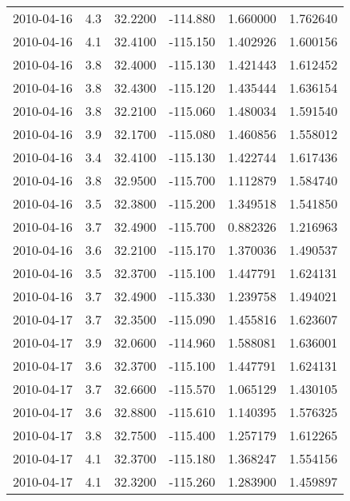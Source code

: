 \begin{tabular}{lrrrrr}
2010-04-16 &       4.3 &  32.2200 &  -114.880 &         1.660000 &         1.762640 \\
2010-04-16 &       4.1 &  32.4100 &  -115.150 &         1.402926 &         1.600156 \\
2010-04-16 &       3.8 &  32.4000 &  -115.130 &         1.421443 &         1.612452 \\
2010-04-16 &       3.8 &  32.4300 &  -115.120 &         1.435444 &         1.636154 \\
2010-04-16 &       3.8 &  32.2100 &  -115.060 &         1.480034 &         1.591540 \\
2010-04-16 &       3.9 &  32.1700 &  -115.080 &         1.460856 &         1.558012 \\
2010-04-16 &       3.4 &  32.4100 &  -115.130 &         1.422744 &         1.617436 \\
2010-04-16 &       3.8 &  32.9500 &  -115.700 &         1.112879 &         1.584740 \\
2010-04-16 &       3.5 &  32.3800 &  -115.200 &         1.349518 &         1.541850 \\
2010-04-16 &       3.7 &  32.4900 &  -115.700 &         0.882326 &         1.216963 \\
2010-04-16 &       3.6 &  32.2100 &  -115.170 &         1.370036 &         1.490537 \\
2010-04-16 &       3.5 &  32.3700 &  -115.100 &         1.447791 &         1.624131 \\
2010-04-16 &       3.7 &  32.4900 &  -115.330 &         1.239758 &         1.494021 \\
2010-04-17 &       3.7 &  32.3500 &  -115.090 &         1.455816 &         1.623607 \\
2010-04-17 &       3.9 &  32.0600 &  -114.960 &         1.588081 &         1.636001 \\
2010-04-17 &       3.6 &  32.3700 &  -115.100 &         1.447791 &         1.624131 \\
2010-04-17 &       3.7 &  32.6600 &  -115.570 &         1.065129 &         1.430105 \\
2010-04-17 &       3.6 &  32.8800 &  -115.610 &         1.140395 &         1.576325 \\
2010-04-17 &       3.8 &  32.7500 &  -115.400 &         1.257179 &         1.612265 \\
2010-04-17 &       4.1 &  32.3700 &  -115.180 &         1.368247 &         1.554156 \\
2010-04-17 &       4.1 &  32.3200 &  -115.260 &         1.283900 &         1.459897 \\

\end{tabular}
